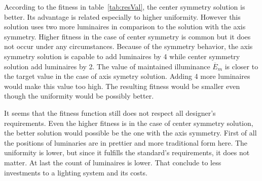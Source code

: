 According to the fitness in table~\ref{tab:resVal}, the center symmetry solution is better. Its advantage is related especially to higher uniformity. However this solution uses two more luminaires in comparison to the solution with the axis symmetry. Higher fitness in the case of center symmetry is common but it does not occur under any circumstances. Because of the symmetry behavior, the axis symmetry solution is capable to add luminaires by 4 while center symmetry solution add luminaires by 2. The value of maintained illuminance $\overline{E}_{m}$ is closer to the target value in the case of axis symetry solution. Adding 4 more luminaires would make this value too high. The resulting fitness would be smaller even though the uniformity would be possibly better.

It seems that the fitness function still does not respect all designer's requirements. Even the higher fitness is in the case of center symmetry solution, the better solution would possible be the one with the axis symmetry. First of all the positions of luminaries are in prettier and more traditional form here. The uniformity is lower, but since it fulfills the standard's requirements, it does not matter. At last the count of luminaires is lower. That conclude to less investments to a lighting system and its costs.

